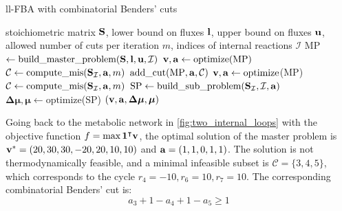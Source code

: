 \begin{algorithm}
    \caption{ll-FBA with combinatorial Benders' cuts}\label{alg:CB}
    \begin{algorithmic}[1]
        \Require stoichiometric matrix $\bold S$, lower bound on fluxes $\bold l$, upper bound on fluxes $\bold u$, allowed number of cuts per iteration $m$, indices of internal reactions $\mathcal{I}$
        \State MP $\gets \text{build\_master\_problem}(\bold S, \bold l, \bold u, \mathcal{I})$
        \State $\bold{v, a} \gets \text{optimize(MP)}$ 
        \State $\mathcal{C} \gets \text{compute\_mis}(\bold S_\mathcal{I}, \bold a, m)$ 
            \State $\text{add\_cut}(\text{MP}, \bold a, \mathcal{C})$ 
            \State $\bold v, \bold a \gets \text{optimize}$(MP)
            \State $\mathcal{C} \gets \text{compute\_mis}(\bold S_\mathcal{I}, \bold a, m)$
        \EndWhile
        \State $\text{SP} \gets \text{build\_sub\_problem}(\bold S_\mathcal{I}, \mathcal{I}, \bold a)$
        \State $\boldsymbol{\Delta \mu}, \boldsymbol \mu \gets \text{optimize}$(SP)
    \State \Return $(\bold v, \bold a, \boldsymbol{\Delta \mu}, \boldsymbol \mu)$ 
    \end{algorithmic}
\end{algorithm}

Going back to the metabolic network in \cref{fig:two_internal_loops}
with the objective function $f = \text{max} \, \bold 1^\intercal \bold v$, the optimal solution of the master problem is $\bold v^* = (20, 30, 30, -20, 20, 10, 10)$ and $\bold a = (1,1,0,1,1)$. 
The solution is not thermodynamically feasible, and a minimal infeasible subset is $\mathcal{C} = \{3, 4, 5\}$, which corresponds to the cycle $r_4=-10, r_6=10, r_7=10$. 
The corresponding combinatorial Benders' cut is:
\begin{equation*}
    a_3 + 1 - a_4 + 1 - a_5 \geq 1
\end{equation*}

